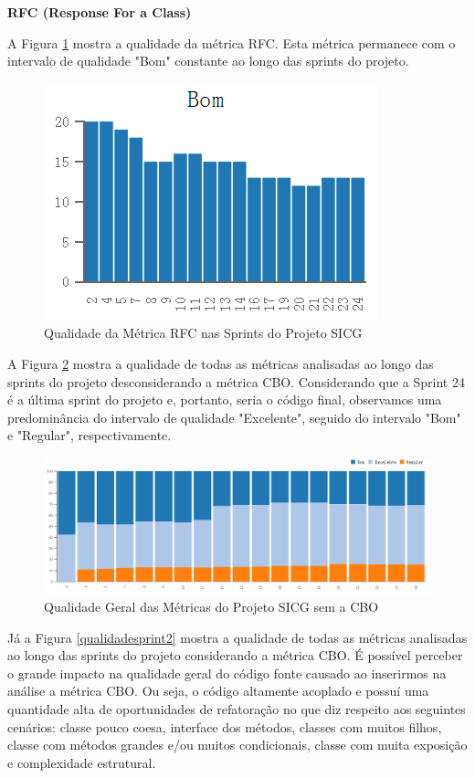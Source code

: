 \textbf{RFC (Response For a Class)} 

A Figura \ref{rfc} mostra a qualidade da métrica RFC. Esta métrica permanece com o intervalo de qualidade "Bom" constante ao longo das sprints do projeto.

\begin{figure}[H]
		\centering
			\includegraphics[scale=1.0]{figuras/rfc.png}
		\caption{Qualidade da Métrica RFC nas Sprints do Projeto SICG}
		\label{rfc}
\end{figure}

A Figura \ref{qualidadesprint} mostra a qualidade de todas as métricas analisadas ao longo das sprints do projeto desconsiderando a métrica CBO. Considerando que a Sprint 24 é a última sprint do projeto e, portanto, seria o código final, observamos uma predominância do intervalo de qualidade "Excelente", seguido do intervalo "Bom" e "Regular", respectivamente. 

\begin{figure}[H]
		\centering
			\includegraphics[scale=0.5]{figuras/todasmetricasSemCOB.png}
		\caption{Qualidade Geral das Métricas do Projeto SICG sem a CBO}
		\label{qualidadesprint}
\end{figure}

Já a Figura \ref{qualidadesprint2} mostra a qualidade de todas as métricas analisadas ao longo das sprints do projeto considerando a métrica CBO. É possível perceber o grande impacto na qualidade geral do código fonte causado ao inserirmos na análise a métrica CBO. Ou seja, o código altamente acoplado e possuí uma quantidade alta de oportunidades de refatoração no que diz respeito aos seguintes cenários: classe pouco coesa, interface dos métodos, classes com muitos filhos, classe com métodos grandes e/ou muitos condicionais, classe com muita exposição e complexidade estrutural. 

